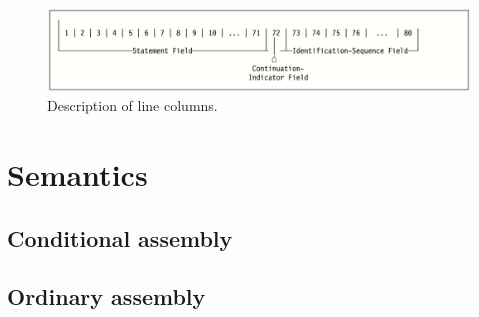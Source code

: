 \begin{figure}[b]\centering
	\includegraphics[scale=0.4]{img/line}
	\caption{Description of line columns.}
	\label{fig01:line}
\end{figure}


\section{Semantics}



\subsection{Conditional assembly}

\subsection{Ordinary assembly}
